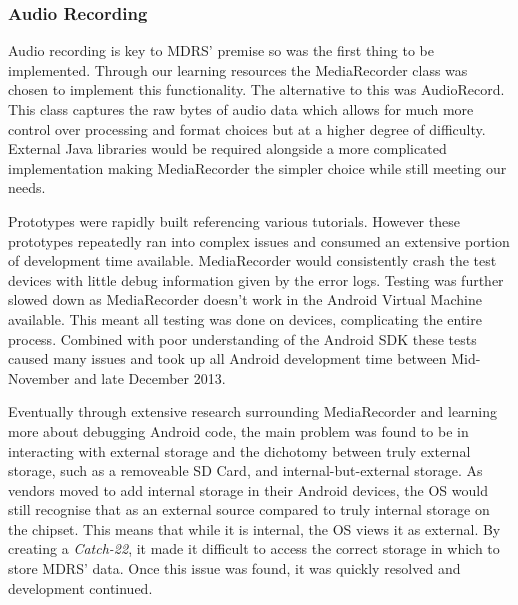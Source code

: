 \documentclass{l3proj}
\begin{document}
\subsubsection{Audio Recording}    Audio recording is key to MDRS' premise so was the first thing to be implemented. Through our learning resources the MediaRecorder class was chosen to implement this functionality. The alternative to this was AudioRecord. This class captures the raw bytes of audio data which allows for much more control over processing and format choices but at a higher degree of difficulty. External Java libraries would be required alongside a more complicated implementation making MediaRecorder the simpler choice while still meeting our needs.

Prototypes were rapidly built referencing various tutorials. However these prototypes repeatedly ran into complex issues and consumed an extensive portion of development time available. MediaRecorder would consistently crash the test devices with little debug information given by the error logs. Testing was further slowed down as MediaRecorder doesn't work in the Android Virtual Machine available. This meant all testing was done on devices, complicating the entire process. Combined with poor understanding of the Android SDK these tests caused many issues and took up all Android development time between Mid-November and late December 2013.

Eventually through extensive research surrounding MediaRecorder and learning more about debugging Android code, the main problem was found to be in interacting with external storage and the dichotomy between truly external storage, such as a removeable SD Card, and internal-but-external storage. As vendors moved to add internal storage in their Android devices, the OS would still recognise that as an external source compared to truly internal storage on the chipset. This means that while it is internal, the OS views it as external. By creating a \textit{Catch-22}, it made it difficult to access the correct storage in which to store MDRS' data. Once this issue was found, it was quickly resolved and development continued.
\end{document}
